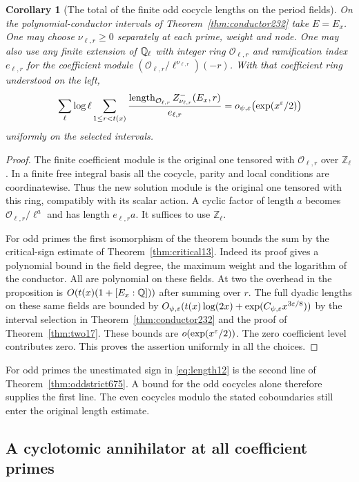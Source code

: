 \documentclass[a4paper,11pt]{article}
\newtheorem{corollary}[proposition]{Corollary}
\theoremstyle{definition}
\theoremstyle{remark}
\newcommand{\ZZ}{\mathbb Z}\newcommand{\ord}{\operatorname{ord}}
\newcommand{\len}{\operatorname{length}}\newcommand{\Res}{\operatorname*{Res}}
\numberwithin{equation}{section}
\begin{document}
\begin{corollary}[The total of the finite odd cocycle lengths on the period fields]
\leavevmode\label{cor:finiteoddtotal675}
On the polynomial-conductor intervals of
Theorem~\ref{thm:conductor232} take \(E=E_x\). One may choose
\(\nu_{\ell,r}\ge0\) separately at each prime, weight and node.
One may also use any finite extension of \(\mathbb Q_\ell\) with
integer ring \(\mathcal O_{\ell,r}\) and ramification index
\(e_{\ell,r}\) for the coefficient module
\((\mathcal O_{\ell,r}/\ell^{\nu_{\ell,r}})(-r)\).
With that coefficient ring understood on the left,
\[
 \sum_{\ell}\log\ell\sum_{1\le r<t(x)}
     \frac{\len_{\mathcal O_{\ell,r}}Z^-_{\nu_{\ell,r}}(E_x,r)}
          {e_{\ell,r}}
             =o_{\psi,\eps}\bigl(\exp(x^\eps/2)\bigr)
\]
uniformly on the selected intervals.
\end{corollary}
\begin{proof}
The finite coefficient module is the original one tensored with
\(\mathcal O_{\ell,r}\) over \(\ZZ_\ell\). In a finite free
integral basis all the cocycle, parity and local conditions are
coordinatewise. Thus the new solution module is the original
one tensored with this ring, compatibly with its scalar action.
A cyclic factor of length \(a\) becomes
\(\mathcal O_{\ell,r}/\ell^a\) and has length \(e_{\ell,r}a\).
It suffices to use \(\ZZ_\ell\).

For odd primes the first isomorphism of the theorem bounds the
sum by the critical-sign estimate of
Theorem~\ref{thm:critical13}. Indeed its proof gives a
polynomial bound in the field degree, the maximum weight and
the logarithm of the conductor. All are polynomial on these
fields. At two the overhead in the proposition is
\(O(t(x)(1+[E_x:\mathbb Q]))\) after summing over \(r\).
The full dyadic lengths on these same fields are bounded by
\(O_{\psi,\varepsilon}(t(x)\log(2x)+\exp(C_{\psi,\varepsilon}x^{3\varepsilon/8}))\)
by the interval selection in Theorem~\ref{thm:conductor232}
and the proof of Theorem~\ref{thm:two17}. These bounds are
\(o(\exp(x^\varepsilon/2))\). The zero coefficient level contributes
zero. This proves the assertion uniformly in all the choices.
\end{proof}

For odd primes the unestimated sign in \eqref{eq:length12}
is the second line of Theorem~\ref{thm:oddstrict675}.
A bound for the odd cocycles alone therefore supplies the first
line. The even cocycles modulo the stated coboundaries still
enter the original length estimate.


\subsection{A cyclotomic annihilator at all coefficient primes}
\label{sec:cocycleannihilator676}
\end{document}
